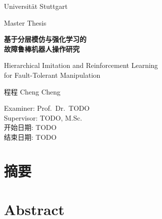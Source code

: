 \documentclass[
  12pt,
  a4paper,
  twoside,
  openright,
]{ctexbook}
\begin{document}
\begin{titlepage}
\centering
\vspace*{2cm}
{\Large Universität Stuttgart \par}
\vspace{0.5cm}
{\large Master Thesis \par}
\vspace{2cm}
{\LARGE\bfseries 基于分层模仿与强化学习的\\[0.3em]故障鲁棒机器人操作研究\par}
\vspace{1cm}
{\Large Hierarchical Imitation and Reinforcement Learning\\[0.3em]
for Fault-Tolerant Manipulation\par}
\vspace{2cm}
{\large 程程 \quad Cheng Cheng\par}
\vspace{1cm}
{\normalsize
  Examiner: Prof.\ Dr.\ TODO \\
  Supervisor: TODO, M.Sc. \\[1em]
  开始日期: TODO \\
  结束日期: TODO \\
}
\vfill
{\small \the\year \par}
\end{titlepage}

\frontmatter

\chapter*{摘\quad 要}


\chapter*{Abstract}


\tableofcontents
\listoffigures
\listoftables

\mainmatter









\printbibliography[heading=bibintoc, title={参考文献}]

% 
\end{document}
